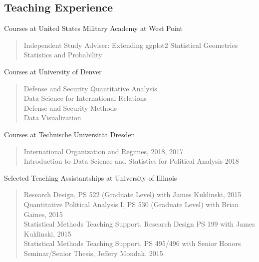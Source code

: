 \documentclass[margin, 10pt]{CVStyleTemplate}\usepackage[]{graphicx}\usepackage[]{color}
\begin{document}
\begin{resume}
\section{Teaching Experience}

Courses at United States Military Academy at West Point

\begin{quotation} \noindent
Independent Study Adviser: Extending ggplot2 Statistical Geometries  \\[6pt]
Statistics and Probability \\[6pt]
\end{quotation}

Courses at University of Denver
\begin{quotation} \noindent
Defense and Security Quantitative Analysis \\[6pt]
Data Science for International Relations  \\[6pt]
Defense and Security Methods \\[6pt]
Data Visualization \\[6pt]
\end{quotation}

Courses at Technische Universit\"{a}t Dresden
\begin{quotation} \noindent
International Organization and Regimes, 2018, 2017 \\[6pt] %
Introduction to Data Science and Statistics for Political Analysis 2018
\end{quotation}

Selected Teaching Assistantships at University of Illinois
\begin{quotation} \noindent
Research Design, PS 522 (Graduate Level) with James Kuklinski, 2015 \\[6pt] %
Quantitative Political Analysis I, PS 530 (Graduate Level) with Brian Gaines, 2015 \\[6pt] %
Statistical Methods Teaching Support, Research Design PS 199 with James Kuklinski, 2015\\[6pt] %
Statistical Methods Teaching Support, PS 495/496  with Senior Honors Seminar/Senior Thesis, Jeffery Mondak, 2015\\[6pt] %
\end{quotation}
%


\end{resume}
\end{document}
